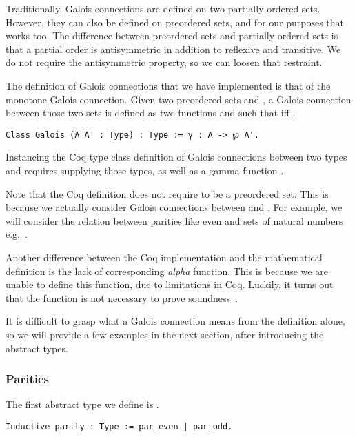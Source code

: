 Traditionally, Galois connections are defined on two partially ordered sets.
However, they can also be defined on preordered sets, and for our purposes that
works too. 
The difference between preordered sets and partially ordered sets is
that a partial order is antisymmetric in addition to reflexive and transitive.
We do not require the antisymmetric property, so we can loosen that restraint.

The definition of Galois connections that we have implemented is that of the
monotone Galois connection. Given two preordered sets  and
, a Galois connection between those two sets is defined as two
functions  and  such that 
 iff .

\begin{verbatim}
Class Galois (A A' : Type) : Type := γ : A -> ℘ A'.
\end{verbatim}

Instancing the Coq type class definition of Galois connections between two
types  and  requires supplying those types, as well as a gamma 
function .

Note that the Coq definition does not require  to be a preordered set. 
This is because we actually consider Galois connections between 
 and . For example, we will consider the relation between 
parities like even and sets of natural numbers e.g.\ .

Another difference between the Coq implementation and the mathematical
definition is the lack of corresponding \textit{alpha} function. This is
because we are unable to define this function, due to limitations in Coq.
Luckily, it turns out that the  function is not necessary to prove
soundness~\cite{jourdan2016verasco}.

It is difficult to grasp what a Galois connection means from the definition
alone, so we will provide a few examples in the next section, after
introducing the abstract types.

\subsubsection{Parities}
The first abstract type we define is .

\begin{listing}
\begin{verbatim}
Inductive parity : Type := par_even | par_odd.
\end{verbatim}
\end{listing}

